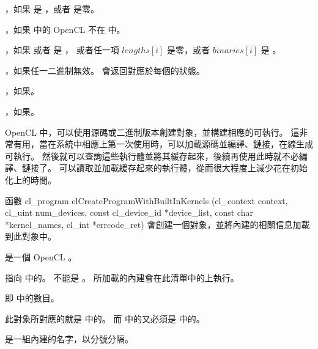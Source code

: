 \item {}，如果  是 ，或者  是零。

\item {}，如果  中的 OpenCL  不在  中。

\item {}，如果  或者  是 ，
或者任一項 $lengths[i]$ 是零，或者 $binaries[i]$ 是 。

\item {}，如果任一二進制無效。  會返回對應於每個的狀態。

\item {}，如果\scdevfailres。

\item {}，如果\schostfailres。
\stopigBase

OpenCL 中，可以使用源碼或二進制版本創建對象，並構建相應的可執行。
這非常有用，當在系統中相應上第一次使用時，可以加載源碼並編譯、鏈接，在線生成可執行。
然後就可以查詢這些執行體並將其緩存起來，後續再使用此時就不必編譯、鏈接了。
可以讀取並加載緩存起來的執行體，從而很大程度上減少花在初始化上的時間。

函數
\startclc
cl_program clCreateProgramWithBuiltInKernels (cl_context context,
			cl_uint num_devices,
			const cl_device_id *device_list,
			const char *kernel_names,
			cl_int *errcode_ret)
\stopclc
會創建一個對象，並將內建的相關信息加載到此對象中。

 是一個 OpenCL 。

 指向  中的。
 不能是 。
所加載的內建會在此清單中的上執行。

 即  中的數目。

此對象所對應的就是  中的。
而  中的又必須是  中的。

 是一組內建的名字，以分號分隔。

